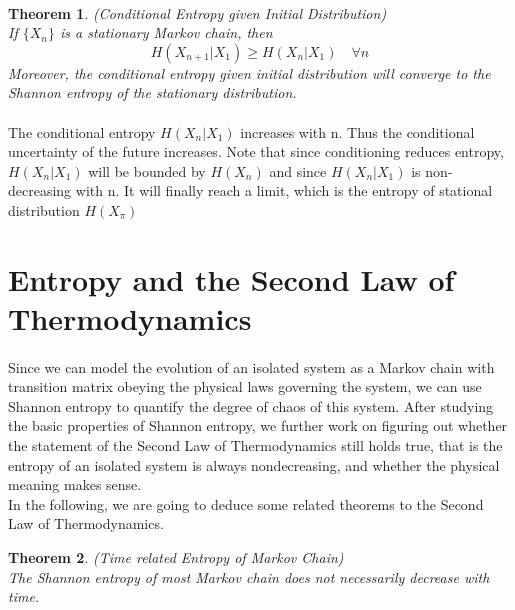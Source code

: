 \documentclass[a4paper, 11pt]{article} %
\newtheorem*{theorem*}{Theorem}
\begin{document}
\paragraph{}

\begin{theorem*}
\emph{(Conditional Entropy given Initial Distribution)}\\
If $\{X_n\}$ is a stationary Markov chain, then
\begin{equation*}
H(X_{n+1}\vert X_1) \geq H(X_n\vert X_1) \quad \forall n
\end{equation*}
Moreover, the conditional entropy given initial distribution will converge to the Shannon entropy of the stationary distribution.
\end{theorem*}

\paragraph{}
The conditional entropy $H(X_{n}|X_{1})$ increases with n. Thus the conditional uncertainty of the future increases. Note that since conditioning reduces entropy, $H(X_{n}|X_{1})$ will be bounded by $H(X_{n})$ and since $H(X_{n}|X_{1})$  is non-decreasing with n. It will finally reach a limit, which is the entropy of stational distribution $H(X_{\pi})$   
\section*{Entropy and the Second Law of Thermodynamics}
\paragraph{}
Since we can model the evolution of an isolated system as a Markov chain with transition matrix obeying the physical laws governing the system, we can use Shannon entropy to quantify the degree of chaos of this system. After studying the basic properties of Shannon entropy, we further work on figuring out whether the statement of the Second Law of Thermodynamics still holds true, that is the entropy of an isolated system is always nondecreasing, and whether the physical meaning makes sense.\\

In the following, we are going to deduce some related theorems to the Second Law of Thermodynamics.

\begin{theorem*}
\emph{(Time related Entropy of Markov Chain)}\\
The Shannon entropy of most Markov chain does not necessarily decrease with time.
\end{theorem*}
\end{document}
